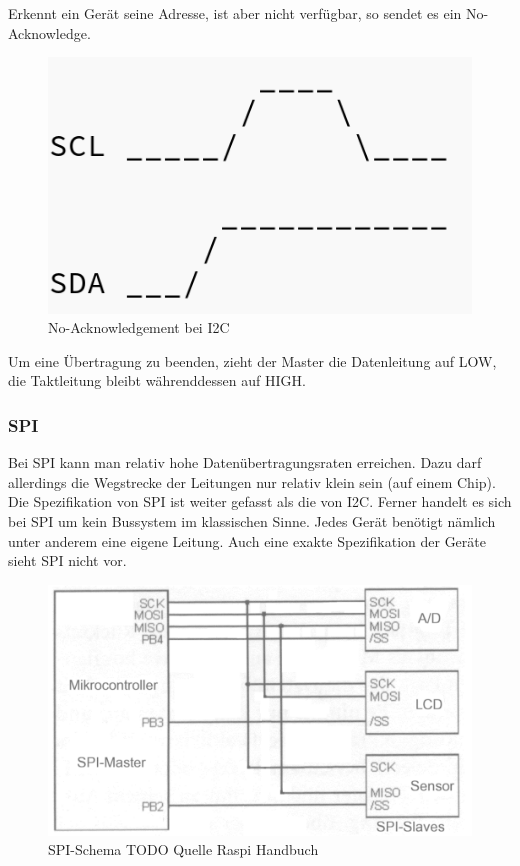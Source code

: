 Erkennt ein Gerät seine Adresse, ist aber nicht verfügbar, so sendet es ein No-Acknowledge.

\begin{figure}[h!] 
\includegraphics[scale=0.3]{bilder/i2C_noAck}
\caption{No-Acknowledgement bei \ac{I2C}}
\label{i2c_NoAck}
\end{figure}

Um eine Übertragung zu beenden, zieht der Master die Datenleitung auf LOW, die Taktleitung bleibt währenddessen auf HIGH. 



\subsubsection{\ac{SPI}}
Bei \ac{SPI} kann man relativ hohe Datenübertragungsraten erreichen. Dazu darf allerdings die Wegstrecke der Leitungen nur relativ klein sein (auf einem Chip). Die Spezifikation von \ac{SPI} ist weiter gefasst als die von \ac{I2C}. Ferner handelt es sich bei \ac{SPI} um kein Bussystem im klassischen Sinne. Jedes Gerät benötigt nämlich unter anderem eine eigene Leitung. Auch eine exakte Spezifikation der Geräte sieht \ac{SPI} nicht vor. 

\begin{figure}[h!] 
\includegraphics[scale=0.3]{bilder/spi}
\caption{SPI-Schema TODO Quelle Raspi Handbuch}
\label{spi}
\end{figure}

